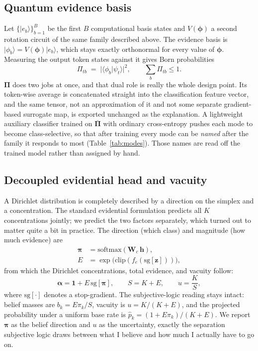 \documentclass[conference]{IEEEtran}
\newcommand{\bs}[1]{\boldsymbol{#1}}
\newcommand{\ket}[1]{\lvert #1 \rangle}
\newcommand{\braket}[2]{\langle #1 \vert #2 \rangle}
\begin{document}
\subsection{Quantum evidence basis}
Let $\{\ket{e_{b}}\}_{b=1}^{B}$ be the first $B$ computational basis states and
$V(\bs{\phi})$ a second rotation circuit of the same family described above. The
evidence basis is $\ket{\phi_{b}} = V(\bs{\phi})\ket{e_{b}}$, which stays exactly
orthonormal for every value of $\bs{\phi}$. Measuring the output token states
against it gives Born probabilities
\begin{equation}
\Pi_{tb} \;=\; \bigl\lvert \braket{\phi_{b}}{\psi_{t}} \bigr\rvert^{2},
\qquad \textstyle\sum_{b}\Pi_{tb}\le 1 .
\label{eq:basis}
\end{equation}
$\bs{\Pi}$ does two jobs at once, and that dual role is really the whole design
point. Its token-wise average is concatenated straight into the classification
feature vector, and the same tensor, not an approximation of it and not some
separate gradient-based surrogate map, is exported unchanged as the explanation. A
lightweight auxiliary classifier trained on $\overline{\bs{\Pi}}$ with ordinary
cross-entropy pushes each mode to become class-selective, so that after training
every mode can be \emph{named} after the family it responds to most
(Table~\ref{tab:modes}). Those names are read off the trained model rather than
assigned by hand.

\subsection{Decoupled evidential head and vacuity}
A Dirichlet distribution is completely described by a direction on the simplex and
a concentration. The standard evidential formulation \cite{sensoy2018edl} predicts
all $K$ concentrations jointly; we predict the two factors separately, which turned
out to matter quite a bit in practice. The direction (which class) and magnitude
(how much evidence) are
\begin{align}
\bs{\pi} &= \mathrm{softmax}(\bs{W}_{c}\,\bs{h}), \label{eq:dir}\\
E &= \exp\bigl(\mathrm{clip}(f_{e}(\mathrm{sg}[\bs{z}]))\bigr), \label{eq:mag}
\end{align}
from which the Dirichlet concentrations, total evidence, and vacuity follow:
\begin{equation}
\bs{\alpha} = \bs{1} + E\,\mathrm{sg}[\bs{\pi}], \qquad S = K + E, \qquad
u = \frac{K}{S},
\label{eq:vacuity}
\end{equation}
where $\mathrm{sg}[\cdot]$ denotes a stop-gradient. The subjective-logic reading
stays intact: belief masses are $b_{k}=E\pi_{k}/S$, vacuity is $u=K/(K+E)$, and the
projected probability under a uniform base rate is
$\hat{p}_{k}=(1+E\pi_{k})/(K+E)$. We report $\bs{\pi}$ as the belief direction and
$u$ as the uncertainty, exactly the separation subjective logic draws between what I
believe and how much I actually have to go on.
\end{document}
